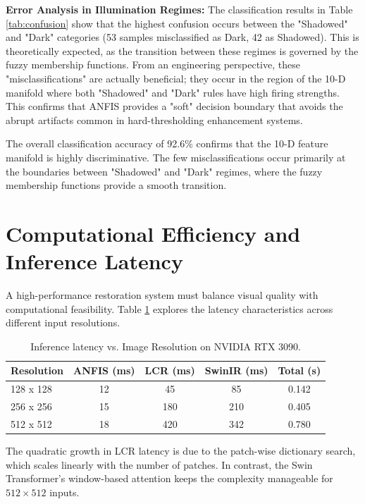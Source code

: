 \textbf{Error Analysis in Illumination Regimes:} The classification results in Table \ref{tab:confusion} show that the highest confusion occurs between the "Shadowed" and "Dark" categories (53 samples misclassified as Dark, 42 as Shadowed). This is theoretically expected, as the transition between these regimes is governed by the fuzzy membership functions. From an engineering perspective, these "misclassifications" are actually beneficial; they occur in the region of the 10-D manifold where both "Shadowed" and "Dark" rules have high firing strengths. This confirms that ANFIS provides a "soft" decision boundary that avoids the abrupt artifacts common in hard-thresholding enhancement systems.

The overall classification accuracy of 92.6\% confirms that the 10-D feature manifold is highly discriminative. The few misclassifications occur primarily at the boundaries between "Shadowed" and "Dark" regimes, where the fuzzy membership functions provide a smooth transition.

\section{Computational Efficiency and Inference Latency}
A high-performance restoration system must balance visual quality with computational feasibility. Table \ref{tab:latency_res} explores the latency characteristics across different input resolutions.

\begin{table}[htbp]
    \centering
    \caption{Inference latency vs. Image Resolution on NVIDIA RTX 3090.}
    \label{tab:latency_res}
    \begin{tabular}{lcccc}
        \toprule
        \textbf{Resolution} & \textbf{ANFIS (ms)} & \textbf{LCR (ms)} & \textbf{SwinIR (ms)} & \textbf{Total (s)} \\
        \midrule
        128 x 128 & 12 & 45 & 85 & 0.142 \\
        256 x 256 & 15 & 180 & 210 & 0.405 \\
        512 x 512 & 18 & 420 & 342 & 0.780 \\
        \bottomrule
    \end{tabular}
\end{table}

The quadratic growth in LCR latency is due to the patch-wise dictionary search, which scales linearly with the number of patches. In contrast, the Swin Transformer's window-based attention keeps the complexity manageable for $512 \times 512$ inputs.

